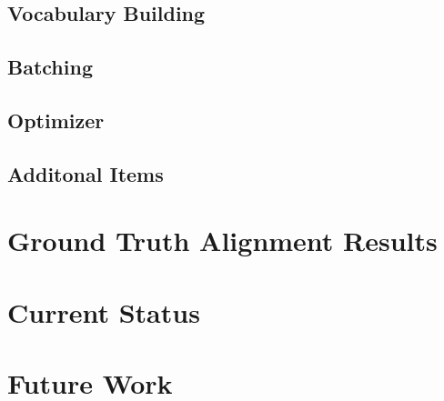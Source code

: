 \documentclass[twoside,twocolumn]{article}
\begin{document}
\subsection{Vocabulary Building}
\subsection{Batching}
\subsection{Optimizer}
\subsection{Additonal Items}

\section{Ground Truth Alignment Results}

\section{Current Status}

\section{Future Work}









\clearpage
\appendix
\onecolumn
\end{document}
